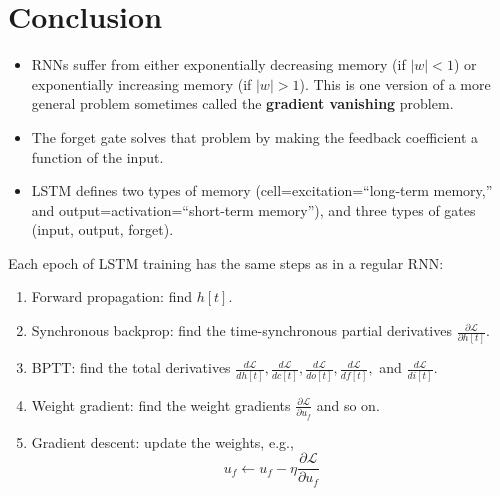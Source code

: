 \documentclass{beamer}
\begin{document}
\section{Conclusion}
\setcounter{subsection}{1}

\begin{frame}
  \begin{itemize}
  \item RNNs suffer from either exponentially decreasing memory (if
    $|w|<1$) or exponentially increasing memory (if $|w|>1$).  This is
    one version of a more general problem sometimes called the {\bf
      gradient vanishing} problem.
  \item The forget gate solves that problem by making the feedback
    coefficient a function of the input.
  \item LSTM defines two types of memory (cell=excitation=``long-term
    memory,'' and output=activation=``short-term memory''), and three
    types of gates (input, output, forget).
  \end{itemize}
\end{frame}

\begin{frame}
  Each epoch of LSTM training has the same steps as in a regular
  RNN:
  \begin{enumerate}
  \item Forward propagation: find $h[t]$.
  \item Synchronous backprop: find the time-synchronous partial
    derivatives $\frac{\partial{\mathcal L}}{\partial h[t]}$.
  \item BPTT: find the total derivatives
    $\frac{d{\mathcal{L}}}{dh[t]},\frac{d{\mathcal{L}}}{dc[t]},\frac{d{\mathcal{L}}}{do[t]},\frac{d{\mathcal{L}}}{df[t]},$
    and $\frac{d{\mathcal{L}}}{di[t]}$.
  \item Weight gradient: find the weight gradients
    $\frac{\partial\mathcal{L}}{\partial u_f}$ and so on.
  \item Gradient descent: update the weights, e.g.,
    \[
    u_f \leftarrow u_f -\eta\frac{\partial\mathcal{L}}{\partial u_f}
    \]
  \end{enumerate}
\end{frame}
\end{document}
